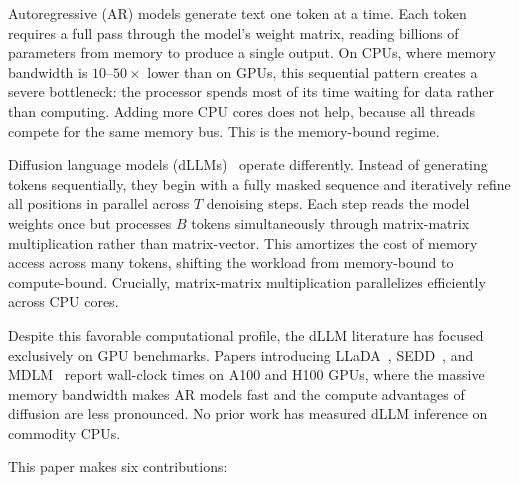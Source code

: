 \documentclass[11pt]{article}
\begin{document}
Autoregressive (AR) models generate text one token at a time. Each token requires a full
pass through the model's weight matrix, reading billions of parameters from memory to
produce a single output. On CPUs, where memory bandwidth is $10$--$50\times$ lower than
on GPUs, this sequential pattern creates a severe bottleneck: the processor spends most
of its time waiting for data rather than computing. Adding more CPU cores does not help,
because all threads compete for the same memory bus. This is the memory-bound regime.

Diffusion language models (dLLMs)~\cite{nie2025,lou2024,sahoo2024} operate differently.
Instead of generating tokens sequentially, they begin with a fully masked sequence and
iteratively refine all positions in parallel across $T$ denoising steps. Each step reads
the model weights once but processes $B$ tokens simultaneously through matrix-matrix
multiplication rather than matrix-vector. This amortizes the cost of memory access across
many tokens, shifting the workload from memory-bound to compute-bound. Crucially,
matrix-matrix multiplication parallelizes efficiently across CPU cores.

Despite this favorable computational profile, the dLLM literature has focused exclusively
on GPU benchmarks. Papers introducing LLaDA~\cite{nie2025}, SEDD~\cite{lou2024}, and
MDLM~\cite{sahoo2024} report wall-clock times on A100 and H100 GPUs, where the massive
memory bandwidth makes AR models fast and the compute advantages of diffusion are less
pronounced. No prior work has measured dLLM inference on commodity CPUs.

This paper makes six contributions:
\end{document}
